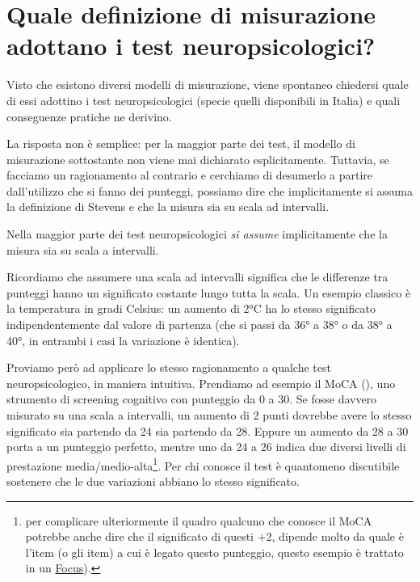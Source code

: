 \documentclass[
  italian,
  letterpaper,
  paper=A4,
  headinclude=on,
  footinclude=on,
  12pt]{scrbook}
\begin{document}
\section{Quale definizione di misurazione adottano i test
neuropsicologici?}\label{quale-definizione-di-misurazione-adottano-i-test-neuropsicologici}

Visto che esistono diversi modelli di misurazione, viene spontaneo
chiedersi quale di essi adottino i test neuropsicologici (specie quelli
disponibili in Italia) e quali conseguenze pratiche ne derivino.

La risposta non è semplice: per la maggior parte dei test, il modello di
misurazione sottostante non viene mai dichiarato esplicitamente.
Tuttavia, se facciamo un ragionamento al contrario e cerchiamo di
desumerlo a partire dall'utilizzo che si fanno dei punteggi, possiamo
dire che implicitamente si assuma la definizione di Stevens e che la
misura sia su scala ad intervalli.

\begin{tcolorbox}[enhanced jigsaw, left=2mm, colbacktitle=quarto-callout-important-color!10!white, bottomrule=.15mm, opacityback=0, coltitle=black, colframe=quarto-callout-important-color-frame, opacitybacktitle=0.6, leftrule=.75mm, colback=white, toprule=.15mm, title=\textcolor{quarto-callout-important-color}{\faExclamation}\hspace{0.5em}{Importante}, titlerule=0mm, arc=.35mm, breakable, rightrule=.15mm, bottomtitle=1mm, toptitle=1mm]

Nella maggior parte dei test neuropsicologici \emph{si assume}
implicitamente che la misura sia su scala a intervalli.

\end{tcolorbox}

Ricordiamo che assumere una scala ad intervalli significa che le
differenze tra punteggi hanno un significato costante lungo tutta la
scala. Un esempio classico è la temperatura in gradi Celsius: un aumento
di 2°C ha lo stesso significato indipendentemente dal valore di partenza
(che si passi da 36° a 38° o da 38° a 40°, in entrambi i casi la
variazione è identica).

Proviamo però ad applicare lo stesso ragionamento a qualche test
neuropsicologico, in maniera intuitiva. Prendiamo ad esempio il MoCA
(\cite{nasreddine2005montreal}), uno strumento di screening cognitivo
con punteggio da 0 a 30. Se fosse davvero misurato su una scala a
intervalli, un aumento di 2 punti dovrebbe avere lo stesso significato
sia partendo da 24 sia partendo da 28. Eppure un aumento da 28 a 30
porta a un punteggio perfetto, mentre uno da 24 a 26 indica due diversi
livelli di prestazione media/medio-alta\footnote{per complicare
  ulteriormente il quadro qualcuno che conosce il MoCA potrebbe anche
  dire che il significato di questi \(+2\), dipende molto da quale è
  l'item (o gli item) a cui è legato questo punteggio, questo esempio è
  trattato in un \hyperref[Focus-item-arbitrari]{Focus}).}. Per chi
conosce il test è quantomeno discutibile sostenere che le due variazioni
abbiano lo stesso significato.
\end{document}
